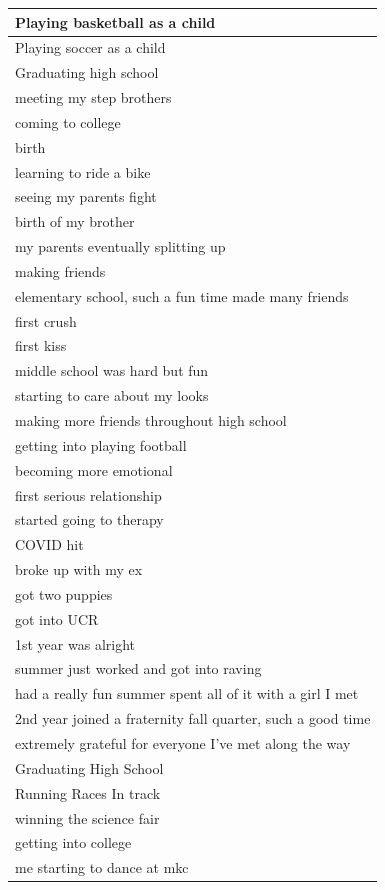 \documentclass[
  .7em,
  letterpaper,
  DIV=11,
  numbers=noendperiod]{scrartcl}
\begin{document}
\begin{table}
\begin{tabular}{l}
\hline
Playing basketball as a child\\
\hline
Playing soccer as a child\\
\hline
Graduating high school\\
\hline
meeting my step brothers\\
\hline
coming to college\\
\hline
birth\\
\hline
learning to ride a bike\\
\hline
seeing my parents fight\\
\hline
birth of my brother\\
\hline
my parents eventually splitting up\\
\hline
making friends\\
\hline
elementary school, such a fun time made many friends\\
\hline
first crush\\
\hline
first kiss\\
\hline
middle school was hard but fun\\
\hline
starting to care about my looks\\
\hline
making more friends throughout high school\\
\hline
getting into playing football\\
\hline
becoming more emotional\\
\hline
first serious relationship\\
\hline
started going to therapy\\
\hline
COVID hit\\
\hline
broke up with my ex\\
\hline
got two puppies\\
\hline
got into UCR\\
\hline
1st year was alright\\
\hline
summer just worked and got into raving\\
\hline
had a really fun summer spent all of it with a girl I met\\
\hline
2nd year joined a fraternity fall quarter, such a good time\\
\hline
extremely grateful for everyone I've met along the way\\
\hline
Graduating High School\\
\hline
Running Races In track\\
\hline
winning the science fair\\
\hline
getting into college\\
\hline
me starting to dance at mkc\\

\end{tabular}
\end{table}
\end{document}
